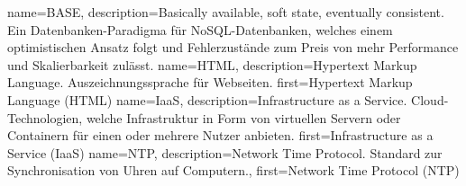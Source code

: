 {%
    name={BASE},
    description={Basically available, soft state, eventually consistent.
    Ein Datenbanken-Paradigma für NoSQL-Datenbanken, welches einem
    optimistischen Ansatz folgt und Fehlerzustände zum Preis von mehr
    Performance und Skalierbarkeit zulässt.}
}
{%
    name={HTML},
    description={Hypertext Markup Language. Auszeichnungssprache für
    Webseiten.}
    first={Hypertext Markup Language (HTML)}
}
{%
    name={IaaS},
    description={Infrastructure as a Service. Cloud-Technologien,
    welche Infrastruktur in Form von virtuellen Servern oder Containern für
    einen oder mehrere Nutzer anbieten.}
    first={Infrastructure as a Service (IaaS)}
}
{%
    name={NTP},
    description={Network Time Protocol. Standard zur Synchronisation von Uhren auf Computern.},
    first={Network Time Protocol (NTP)}
}
